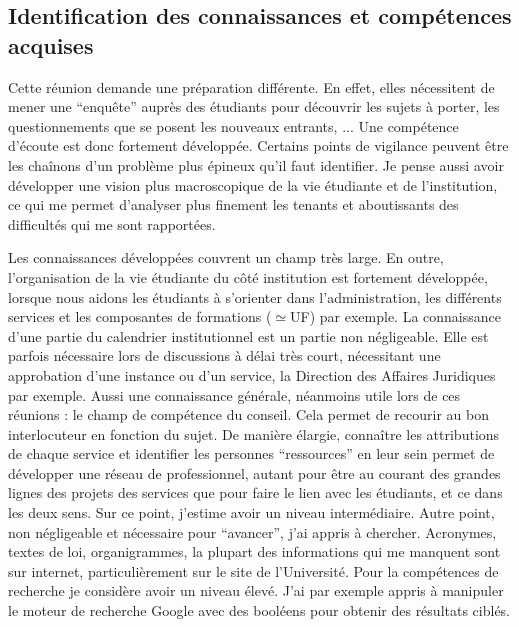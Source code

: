 \documentclass{article}
\begin{document}
\subsection{Identification des connaissances et compétences acquises}
Cette réunion demande une préparation différente. 
En effet, elles nécessitent de mener une ``enquête''  auprès des étudiants pour découvrir les sujets à porter, les questionnements que se posent les nouveaux entrants, ... 
Une compétence d'écoute est donc fortement développée. 
Certains points de vigilance peuvent être les chaînons d'un problème plus épineux qu'il faut identifier. Je pense aussi avoir développer une vision plus macroscopique de la vie étudiante et de l'institution, ce qui me permet d'analyser plus finement les tenants et aboutissants des difficultés qui me sont rapportées. \par 
Les connaissances développées couvrent un champ très large. 
En outre, l'organisation de la vie étudiante du côté institution est fortement développée, lorsque nous aidons les étudiants à s'orienter dans l'administration, les différents services et les composantes de formations ($\simeq$UF) par exemple. 
La connaissance d'une partie du calendrier institutionnel est un partie non négligeable. 
Elle est parfois nécessaire lors de discussions à délai très court, nécessitant une approbation d'une instance ou d'un service, la Direction des Affaires Juridiques par exemple.
Aussi une connaissance générale, néanmoins utile lors de ces réunions : le champ de compétence du conseil. 
Cela permet de recourir au bon interlocuteur en fonction du sujet. 
De manière élargie, connaître les attributions de chaque service et identifier les personnes ``ressources'' en leur sein permet de développer une réseau de professionnel, autant pour être au courant des grandes lignes des projets des services que pour faire le lien avec les étudiants, et ce dans les deux sens. Sur ce point, j'estime avoir un niveau intermédiaire.
Autre point, non négligeable et nécessaire pour ``avancer'', j'ai appris à chercher. 
Acronymes, textes de loi, organigrammes, la plupart des informations qui me manquent sont sur internet, particulièrement sur le site de l'Université. 
Pour la compétences de recherche je considère avoir un niveau élevé. J'ai par exemple appris à manipuler le moteur de recherche Google avec des booléens pour obtenir des résultats ciblés.

\newpage
\end{document}
